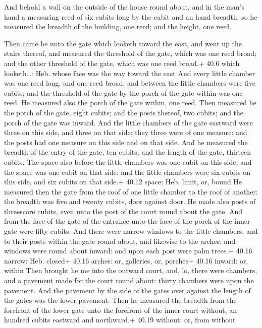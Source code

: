  And behold a wall on the outside of the house round about,
and in the man's hand a measuring reed of six cubits long by the cubit
and an hand breadth: so he measured the breadth of the building, one
reed; and the height, one reed.

 Then came he unto the gate which looketh toward the east,
and went up the stairs thereof, and measured the threshold of the gate,
which was one reed broad; and the other threshold of the gate, which was
one reed broad.+ 40.6 which looketh\ldots: Heb. whose face was the way
toward the east  And every little chamber was one reed long,
and one reed broad; and between the little chambers were five cubits;
and the threshold of the gate by the porch of the gate within was one
reed.  He measured also the porch of the gate within, one
reed.  Then measured he the porch of the gate, eight cubits;
and the posts thereof, two cubits; and the porch of the gate was inward.
 And the little chambers of the gate eastward were three on
this side, and three on that side; they three were of one measure: and
the posts had one measure on this side and on that side. 
And he measured the breadth of the entry of the gate, ten cubits; and
the length of the gate, thirteen cubits.  The space also
before the little chambers was one cubit on this side, and the space was
one cubit on that side: and the little chambers were six cubits on this
side, and six cubits on that side.+ 40.12 space: Heb. limit, or, bound
 He measured then the gate from the roof of one little
chamber to the roof of another: the breadth was five and twenty cubits,
door against door.  He made also posts of threescore
cubits, even unto the post of the court round about the gate.
 And from the face of the gate of the entrance unto the
face of the porch of the inner gate were fifty cubits.  And
there were narrow windows to the little chambers, and to their posts
within the gate round about, and likewise to the arches: and windows
were round about inward: and upon each post were palm trees.+ 40.16
narrow: Heb. closed+ 40.16 arches: or, galleries, or, porches+ 40.16
inward: or, within  Then brought he me into the outward
court, and, lo, there were chambers, and a pavement made for the court
round about: thirty chambers were upon the pavement.  And
the pavement by the side of the gates over against the length of the
gates was the lower pavement.  Then he measured the breadth
from the forefront of the lower gate unto the forefront of the inner
court without, an hundred cubits eastward and northward.+ 40.19 without:
or, from without

